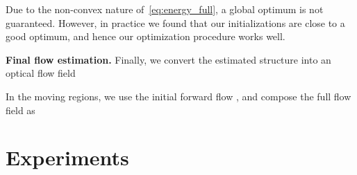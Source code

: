 \documentclass[10pt,twocolumn,letterpaper]{article}
\begin{document}
Due to the non-convex nature of~\eqref{eq:energy_full}, a global optimum is not guaranteed.
However, in practice we found that our initializations are close to a good optimum, and hence our optimization procedure works well.

{\bf Final flow estimation.}
Finally, we convert the estimated structure  into an optical flow field

In the moving regions, we use the initial forward flow , and compose the full flow field as






	 
%
 \section{Experiments}
\newcommand{\resultwidth}{0.20\textwidth}
\end{document}

